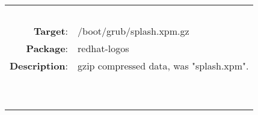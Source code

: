 \begin{longtable}{rl}
\hline
\multicolumn{2}{l}{\ }\\
\textbf{Target}: & /boot/grub/splash.xpm.gz\\
\textbf{Package}: & redhat-logos\\
\textbf{Description}: & gzip compressed data, was "splash.xpm".\\
\multicolumn{2}{l}{\ }\\
\hline
\multicolumn{2}{l}{\ }\\
\end{longtable}
